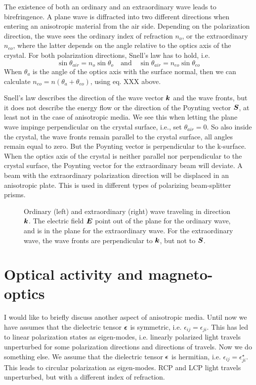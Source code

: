 The existence of both an ordinary and an extraordinary wave leads to birefringence. A plane wave is diffracted into two different directions when entering an anisotropic material from the air side. Depending on the polarization direction, the wave sees the ordinary index of refraction $n_o$, or the extraordinary $n_{eo}$, where the latter depends on the  angle relative to the optics axis of the crystal. For both polarization directions, Snell's law has to hold, i.e.
\begin{equation}
    \sin \theta_{air} = n_o \sin \theta_o \quad \text{and} \quad   \sin \theta_{air} = n_{eo} \sin \theta_{eo} 
\end{equation}
When $\theta_a$ is the angle of the optics axis with the surface normal, then we can calculate $n_{eo} = n(\theta_a + \theta_{eo})$, using eq. XXX above.

Snell's law describes the direction of the wave vector $\boldsymbol{k}$ and the wave fronts, but it does not describe the energy flow or the direction of the Poynting vector $\boldsymbol{S}$, at least not in the case of anisotropic media. We see this when letting the plane wave impinge perpendicular on the crystal surface, i.e., set $\theta_{air} = 0$. So also inside the crystal, the wave fronts remain parallel to the crystal surface, all angles remain equal to zero. But the Poynting vector is perpendicular to the k-surface. When the optics axis of the crystal is neither parallel nor perpendicular to the crystal surface, the Poynting vector for the extraordinary beam will deviate. A beam with the extraordinary polarization direction will be displaced in an anisotropic plate. This is used in different types of polarizing beam-splitter prisms.


\begin{figure}
    \caption{Ordinary (left) and extraordinary (right) wave traveling in direction $\boldsymbol{k}$. The electric field $\boldsymbol{E}$ point out of the plane for the ordinary wave, and is in the plane for the extraordinary wave. For the extraordinary wave, the wave fronts are perpendicular to $\boldsymbol{k}$, but not to $\boldsymbol{S}$.}
\end{figure}


\section{Optical activity and magneto-optics}

I would like to briefly discuss another aspect of anisotropic media. Until now we have assumes that the dielectric tensor $\boldsymbol{\epsilon}$ is symmetric, i.e. $\epsilon_{ij} = \epsilon_{ji}$. This has led to linear polarization states as eigen-modes, i.e. linearly polarized light travels unperturbed for some polarization directions and directions of travels. Now we do something else. We assume that the dielectric tensor $\boldsymbol{\epsilon}$ is hermitian, i.e. $\epsilon_{ij} = \epsilon_{ji}^\star$. This leads to circular polarization as eigen-modes. RCP and LCP light travels unperturbed, but with a different index of refraction.

